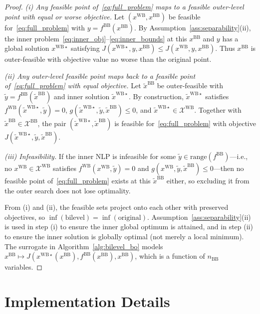 \documentclass[12pt,a4paper]{article}%
\theoremstyle{plain}%
\theoremstyle{remark}%
\theoremstyle{definition}%
\def\WB{\mathrm{WB}}
\def\BB{\mathrm{BB}}
\begin{document}
\begin{appendices}
\begin{proof}
\emph{(i) Any feasible point of~\eqref{eq:full_problem} maps to a feasible outer-level point with equal or worse objective.}
Let $(x^{\WB}, x^{\BB})$ be feasible for~\eqref{eq:full_problem} with $y = f^{\BB}(x^{\BB})$. By Assumption~\ref{ass:separability}(ii), the inner problem~\eqref{eq:inner_obj}--\eqref{eq:inner_bounds} at this $x^{\BB}$ and $y$ has a global solution $x^{\WB\star}$ satisfying $J(x^{\WB\star}, y, x^{\BB}) \leq J(x^{\WB}, y, x^{\BB})$. Thus $x^{\BB}$ is outer-feasible with objective value no worse than the original point.

\emph{(ii) Any outer-level feasible point maps back to a feasible point of~\eqref{eq:full_problem} with equal objective.}
Let $\tilde{x}^{\BB}$ be outer-feasible with $\tilde{y} = f^{\BB}(\tilde{x}^{\BB})$ and inner solution $\tilde{x}^{\WB\star}$. By construction, $\tilde{x}^{\WB\star}$ satisfies $f^{\WB}(\tilde{x}^{\WB\star}, \tilde{y}) = 0$, $g(\tilde{x}^{\WB\star}, \tilde{y}, \tilde{x}^{\BB}) \leq 0$, and $\tilde{x}^{\WB\star} \in \mathcal{X}^{\WB}$. Together with $\tilde{x}^{\BB} \in \mathcal{X}^{\BB}$, the pair $(\tilde{x}^{\WB\star}, \tilde{x}^{\BB})$ is feasible for~\eqref{eq:full_problem} with objective $J(\tilde{x}^{\WB\star}, \tilde{y}, \tilde{x}^{\BB})$.

\emph{(iii) Infeasibility.}
If the inner NLP is infeasible for some $\tilde{y} \in \text{range}(f^{\BB})$---i.e., no $x^{\WB} \in \mathcal{X}^{\WB}$ satisfies $f^{\WB}(x^{\WB}, \tilde{y}) = 0$ and $g(x^{\WB}, \tilde{y}, \tilde{x}^{\BB}) \leq 0$---then no feasible point of~\eqref{eq:full_problem} exists at this $\tilde{x}^{\BB}$ either, so excluding it from the outer search does not lose optimality.

From (i) and (ii), the feasible sets project onto each other with preserved objectives, so $\inf(\text{bilevel}) = \inf(\text{original})$. Assumption~\ref{ass:separability}(ii) is used in step (i) to ensure the inner global optimum is attained, and in step (ii) to ensure the inner solution is globally optimal (not merely a local minimum). The surrogate in Algorithm~\ref{alg:bilevel_bo} models $x^{\BB} \mapsto J(x^{\WB\star}(x^{\BB}), f^{\BB}(x^{\BB}), x^{\BB})$, which is a function of $n_{\BB}$ variables.
\end{proof}

\section{Implementation Details}\label{sec:implementation_details}


\end{appendices}
\end{document}
